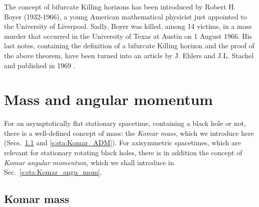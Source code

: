 \begin{hist} \label{h:sta:Boyer}
The concept of bifurcate Killing horizons has been introduced by Robert H. Boyer
(1932-1966), a young American mathematical physicist just appointed to the University
of Liverpool. Sadly, Boyer was killed, among 14 victims, in a mass murder that
occurred in the University of Texas at Austin on 1 August 1966.
His last notes, containing the definition of a bifurcate Killing horizon
and the proof of the above theorem, have been turned into an article
by J. Ehlers and J.L. Stachel and published in 1969 \cite{Boyer69}.
\end{hist}



\section{Mass and angular momentum}

For an asymptotically flat stationary spacetime, containing a
black hole or not, there is a well-defined concept of mass: the \emph{Komar mass},
which we introduce here (Secs.~\ref{s:sta:Komar_mass} and \ref{s:sta:Komar_ADM}).
For axisymmetric spacetimes, which are relevant
for stationary rotating black holes, there is in addition the concept
of \emph{Komar angular momentum}, which we shall introduce in Sec.~\ref{s:sta:Komar_angu_mom}.

\subsection{Komar mass} \label{s:sta:Komar_mass}

